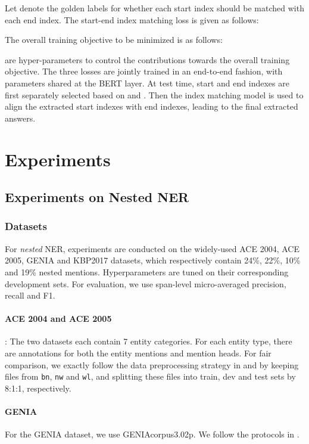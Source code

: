 \documentclass[11pt,a4paper]{article}
\begin{document}
Let   denote the golden labels for whether each start index should be matched with each end index. The start-end index matching loss is given as follows:

The overall training objective to be minimized is as follows:

 are hyper-parameters to control the contributions towards the overall training objective. The three losses are jointly trained in an end-to-end fashion, with parameters shared at the BERT layer. At test time, start and end indexes are first separately selected based on  and . Then the index matching model is used to align the extracted start indexes with end indexes, leading to the final extracted answers. 




\section{Experiments}

\subsection{Experiments on Nested NER} 
\subsubsection{Datasets} 
For {\em nested} NER, experiments are conducted on the  
widely-used  ACE 2004, ACE 2005, GENIA and KBP2017 datasets, which respectively contain  24\%, 22\%, 10\% and 19\% nested mentions. 
Hyperparameters are tuned on their corresponding development sets. 
For evaluation, we 
use span-level micro-averaged precision, recall and F1.  

\paragraph{ACE 2004 and ACE 2005}\cite{ace2004ner, ace2005ner}:
The two datasets each contain 7 entity categories. 
For each entity type, there are annotations for
both
 the entity mentions and mention heads. 
For fair comparison, 
we exactly follow the data preprocessing strategy in  and  by keeping files from \texttt{bn}, \texttt{nw} and \texttt{wl},  and splitting these files into train, dev and test sets  by 8:1:1, respectively. 


\paragraph{GENIA} \cite{genia} For the GENIA dataset, we use GENIAcorpus3.02p.
We follow the protocols in .
\end{document}
